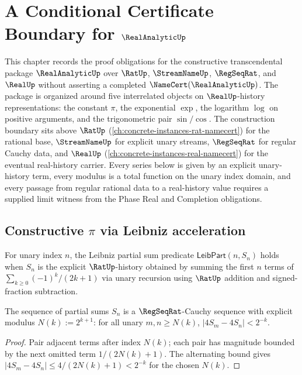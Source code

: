 \chapter{A Conditional Certificate Boundary for $\RealAnalyticUp$}
\label{ch:concrete-instances-real-analytic-namecert}

This chapter records the proof obligations for the constructive transcendental package $\RealAnalyticUp$ over $\RatUp$, $\StreamNameUp$, $\RegSeqRat$, and $\RealUp$ without asserting a completed $\NameCert(\RealAnalyticUp)$. The package is organized around five interrelated objects on $\RealUp$-history representations: the constant $\pi$, the exponential $\exp$, the logarithm $\log$ on positive arguments, and the trigonometric pair $\sin / \cos$. The construction boundary sits above $\RatUp$ (\autoref{ch:concrete-instances-rat-namecert}) for the rational base, $\StreamNameUp$ for explicit unary streams, $\RegSeqRat$ for regular Cauchy data, and $\RealUp$ (\autoref{ch:concrete-instances-real-namecert}) for the eventual real-history carrier. Every series below is given by an explicit unary-history term, every modulus is a total function on the unary index domain, and every passage from regular rational data to a real-history value requires a supplied limit witness from the Phase Real and Completion obligations.

\section{Constructive \(\pi\) via Leibniz acceleration}
\label{sec:real-analytic-pi}

\begin{definition}
\label{def:real-analytic-leibniz-partial-sum}
For unary index \(n\), the Leibniz partial sum predicate \(\mathsf{LeibPart}(n, S_n)\) holds when \(S_n\) is the explicit \(\RatUp\)-history obtained by summing the first \(n\) terms of \(\sum_{k \geq 0} (-1)^k / (2k+1)\) via unary recursion using \(\RatUp\) addition and signed-fraction subtraction.
\end{definition}

\begin{lemma}
\label{lem:real-analytic-leibniz-cauchy}
The sequence of partial sums \(S_n\) is a \(\RegSeqRat\)-Cauchy sequence with explicit modulus \(N(k) := 2^{k+1}\): for all unary \(m, n \geq N(k)\), \(|4 S_m - 4 S_n| < 2^{-k}\).
\end{lemma}
\begin{proof}
Pair adjacent terms after index \(N(k)\); each pair has magnitude bounded by the next omitted term \(1/(2N(k)+1)\). The alternating bound gives \(|4 S_m - 4 S_n| \leq 4/(2N(k)+1) < 2^{-k}\) for the chosen \(N(k)\).
\end{proof}

